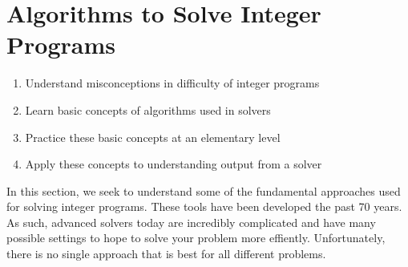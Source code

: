 
%

\chapter{Algorithms to Solve Integer Programs}

\label{sec:IP-algorithms}


\begin{outcome}
\begin{enumerate}
\item Understand misconceptions in difficulty of integer programs
\item Learn basic concepts of algorithms used in solvers
\item Practice these basic concepts at an elementary level
\item Apply these concepts to understanding output from a solver
\end{enumerate}
\end{outcome}

In this section, we seek to understand some of the fundamental approaches used for solving integer programs.   These tools have been developed the past 70 years.  As  such, advanced solvers today are incredibly complicated and have many possible settings to hope to solve your problem more effiently.  Unfortunately, there is no single approach that is best for all different problems.


